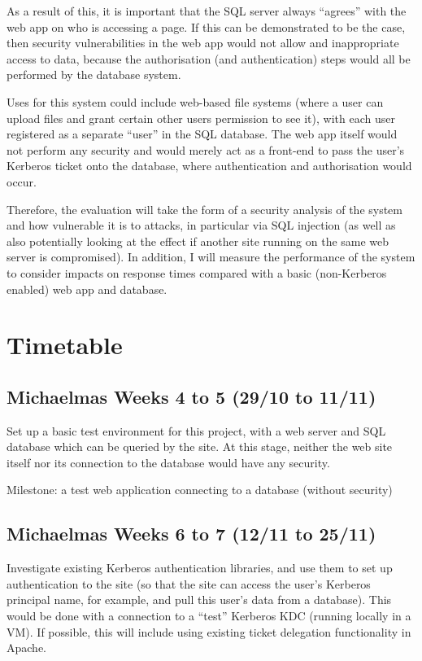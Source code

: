 \documentclass{article}
\begin{document}
As a result of this, it is important that the SQL server always ``agrees'' with the web app on who is accessing a page. If this can be demonstrated to be the case, then security vulnerabilities in the web app would not allow and inappropriate access to data, because the authorisation (and authentication) steps would all be performed by the database system.

Uses for this system could include web-based file systems (where a user can upload files and grant certain other users permission to see it), with each user registered as a separate ``user'' in the SQL database. The web app itself would not perform any security and would merely act as a front-end to pass the user's Kerberos ticket onto the database, where authentication and authorisation would occur.

Therefore, the evaluation will take the form of a security analysis of the system and how vulnerable it is to attacks, in particular via SQL injection (as well as also potentially looking at the effect if another site running on the same web server is compromised). In addition, I will measure the performance of the system to consider impacts on response times compared with a basic (non-Kerberos enabled) web app and database.

\section*{Timetable}
\subsection*{Michaelmas Weeks 4 to 5 (29/10 to 11/11)}
Set up a basic test environment for this project, with a web server and SQL database which can be queried by the site. At this stage, neither the web site itself nor its connection to the database would have any security.

Milestone: a test web application connecting to a database (without security)

\subsection*{Michaelmas Weeks 6 to 7 (12/11 to 25/11)}
Investigate existing Kerberos authentication libraries, and use them to set up authentication to the site (so that the site can access the user's Kerberos principal name, for example, and pull this user's data from a database). This would be done with a connection to a ``test'' Kerberos KDC (running locally in a VM). If possible, this will include using existing ticket delegation functionality in Apache.
\end{document}
